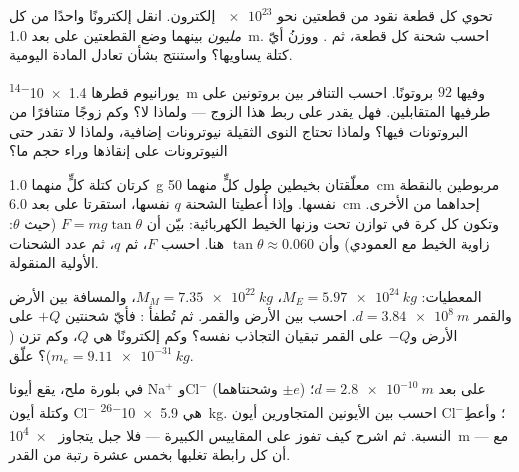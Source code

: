 \begin{exercise}[$\star\star$]\label{exo:g11:fundamental-interactions:11}
تحوي كل قطعة نقود من قطعتين نحو $\num{e23}$ إلكترون. انقل إلكترونًا
واحدًا من كل \emph{مليون} بينهما وضع القطعتين على بعد \qty{1.0}{m}.
احسب شحنة كل قطعة، ثم . ووزنُ أيّ كتلة
يساويها؟ واستنتج بشأن تعادل المادة اليومية.
\end{exercise}

\begin{exercise}[$\star\star\star$]\label{exo:g11:fundamental-interactions:12}
 يورانيوم قطرها \qty{1.4e-14}{m} وفيها $92$ بروتونًا.
احسب التنافر بين بروتونين على طرفيها المتقابلين. فهل يقدر
 على ربط هذا الزوج --- ولماذا لا؟ وكم زوجًا
متنافرًا من البروتونات فيها؟ ولماذا تحتاج النوى الثقيلة نيوترونات إضافية،
ولماذا لا تقدر حتى النيوترونات على إنقاذها وراء حجم ما؟
\end{exercise}

\begin{exercise}[$\star\star\star$]\label{exo:g11:fundamental-interactions:13}
كرتان كتلة كلٍّ منهما \qty{1.0}{g} معلّقتان بخيطين طول كلٍّ منهما \qty{50}{cm} مربوطين
بالنقطة نفسها. وإذا أُعطيتا الشحنة $q$ نفسها، استقرتا على بعد \qty{6.0}{cm}
إحداهما من الأخرى. وتكون كل كرة في توازن تحت وزنها  الخيط
 الكهربائية: بيّن أن $F = mg\tan\theta$ (حيث $\theta$:
زاوية الخيط مع العمودي) وأن $\tan\theta \approx 0.060$ هنا.
احسب $F$، ثم $q$، ثم عدد الشحنات الأولية المنقولة.
\end{exercise}

\begin{exercise}[$\star\star\star$]\label{exo:g11:fundamental-interactions:14}
المعطيات: $M_E = \qty{5.97e24}{kg}$، $M_M = \qty{7.35e22}{kg}$، والمسافة بين الأرض
والقمر $d = \qty{3.84e8}{m}$. احسب  بين الأرض والقمر.
ثم تُطفأ : فأيّ شحنتين $+Q$ على الأرض و$-Q$
على القمر تبقيان التجاذب نفسه؟ وكم إلكترونًا هي $Q$، وكم
تزن ($m_e = \qty{9.11e-31}{kg}$)؟ علّق.
\end{exercise}

\begin{exercise}[$\star\star\star$]\label{exo:g11:fundamental-interactions:15}
في بلورة ملح، يقع أيونا Na$^{+}$ وCl$^{-}$ (وشحنتاهما $\pm e$) على بعد
$d = \qty{2.8e-10}{m}$؛ وكتلة أيون Cl$^{-}$ هي \qty{5.9e-26}{kg}.
احسب  بين الأيونين المتجاورين  أيون
Cl$^{-}$؛ وأعطِ النسبة. ثم اشرح كيف تفوز  على المقاييس
الكبيرة --- فلا جبل يتجاوز \qty{e4}{m} --- مع أن كل رابطة تغلبها
بخمس عشرة رتبة من القدر.
\end{exercise}

